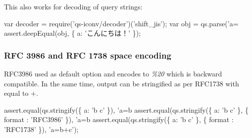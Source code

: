 This also works for decoding of query strings\+:


\begin{DoxyCode}
var decoder = require('qs-iconv/decoder')('shift\_jis');
var obj = qs.parse('a=%
assert.deepEqual(obj, \{ a: 'こんにちは！' \});
\end{DoxyCode}


\subsubsection*{R\+FC 3986 and R\+FC 1738 space encoding}

R\+F\+C3986 used as default option and encodes \textquotesingle{} \textquotesingle{} to {\itshape \%20} which is backward compatible. In the same time, output can be stringified as per R\+F\+C1738 with \textquotesingle{} \textquotesingle{} equal to \textquotesingle{}+\textquotesingle{}.


\begin{DoxyCode}
assert.equal(qs.stringify(\{ a: 'b c' \}), 'a=b%
assert.equal(qs.stringify(\{ a: 'b c' \}, \{ format : 'RFC3986' \}), 'a=b%
assert.equal(qs.stringify(\{ a: 'b c' \}, \{ format : 'RFC1738' \}), 'a=b+c');
\end{DoxyCode}
 